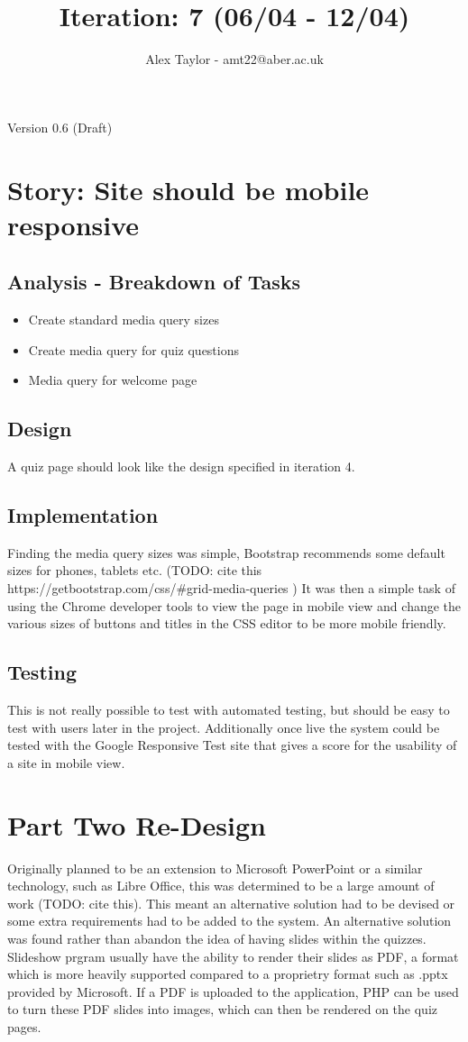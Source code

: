 \documentclass{article}
\title{Iteration: 7 (06/04 - 12/04)}
\author{Alex Taylor - amt22@aber.ac.uk}
\begin{document}
\maketitle
\begin{center}
	Version 0.6 (Draft)
\end{center}
\tableofcontents
\thispagestyle{empty}
\newpage

\section{Story: Site should be mobile responsive}
\subsection{Analysis - Breakdown of Tasks}
\begin{itemize}
	\item Create standard media query sizes
	\item Create media query for quiz questions
	\item Media query for welcome page
\end{itemize}
\subsection{Design}
A quiz page should look like the design specified in iteration 4.
\subsection{Implementation}
Finding the media query sizes was simple, Bootstrap recommends some default sizes for phones, tablets etc. (TODO: cite this https://getbootstrap.com/css/\#grid-media-queries ) It was then a simple task of using the Chrome developer tools to view the page in mobile view and change the various sizes of buttons and titles in the CSS editor to be more mobile friendly.
\subsection{Testing}
This is not really possible to test with automated testing, but should be easy to test with users later in the project. Additionally once live the system could be tested with the Google Responsive Test site that gives a score for the usability of a site in mobile view.
\newpage

\section{Part Two Re-Design}
Originally planned to be an extension to Microsoft PowerPoint or a similar technology, such as Libre Office, this was determined to be a large amount of work (TODO: cite this). This meant an alternative solution had to be devised or some extra requirements had to be added to the system. An alternative solution was found rather than abandon the idea of having slides within the quizzes. Slideshow prgram usually have the ability to render their slides as PDF, a format which is more heavily supported compared to a proprietry format such as .pptx provided by Microsoft. If a PDF is uploaded to the application, PHP can be used to turn these PDF slides into images, which can then be rendered on the quiz pages.
\end{document}
